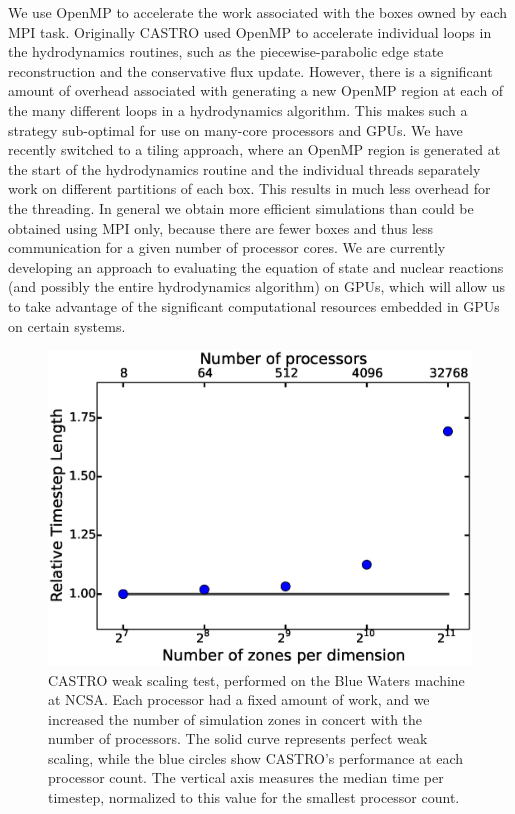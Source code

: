 \documentclass[iop]{../emulateapj}
\begin{document}
We use OpenMP to accelerate the work associated with the boxes owned by each 
MPI task. Originally CASTRO used OpenMP to accelerate individual loops in the 
hydrodynamics routines, such as the piecewise-parabolic edge state reconstruction 
and the conservative flux update. However, there is a significant amount of 
overhead associated with generating a new OpenMP region at each of the many 
different loops in a hydrodynamics algorithm. This makes such a strategy 
sub-optimal for use on many-core processors and GPUs. We have recently switched 
to a tiling approach, where an OpenMP region is generated at the start of 
the hydrodynamics routine and the individual threads separately work on 
different partitions of each box. This results in much less overhead for 
the threading. In general we obtain more efficient simulations than 
could be obtained using MPI only, because there are fewer boxes and thus 
less communication for a given number of processor cores. We are currently 
developing an approach to evaluating the equation of state and nuclear reactions 
(and possibly the entire hydrodynamics algorithm) on GPUs, which will allow us
to take advantage of the significant computational resources embedded in GPUs on 
certain systems.

\begin{figure}
  \centering
  \includegraphics[scale=0.4]{plots/weak_scaling}
  \caption{CASTRO weak scaling test, performed on the Blue Waters machine at 
    NCSA. Each processor had a fixed amount of work, and we increased the 
    number of simulation zones in concert with the number of processors. The 
    solid curve represents perfect weak scaling, while the blue circles show 
    CASTRO's performance at each processor count. The vertical axis measures 
    the median time per timestep, normalized to this value for the smallest 
    processor count.\label{fig:weak_scaling}}
\end{figure}
\end{document}
